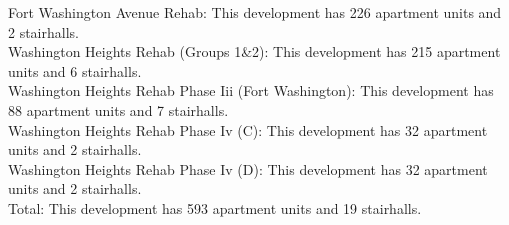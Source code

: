 {Fort Washington Avenue Rehab}: This development has 226 apartment units and 2 stairhalls.\\{Washington Heights Rehab (Groups 1\&2)}: This development has 215 apartment units and 6 stairhalls.\\{Washington Heights Rehab Phase Iii (Fort Washington)}: This development has 88 apartment units and 7 stairhalls.\\{Washington Heights Rehab Phase Iv (C)}: This development has 32 apartment units and 2 stairhalls.\\{Washington Heights Rehab Phase Iv (D)}: This development has 32 apartment units and 2 stairhalls.\\{Total}: This development has 593 apartment units and 19 stairhalls.\\